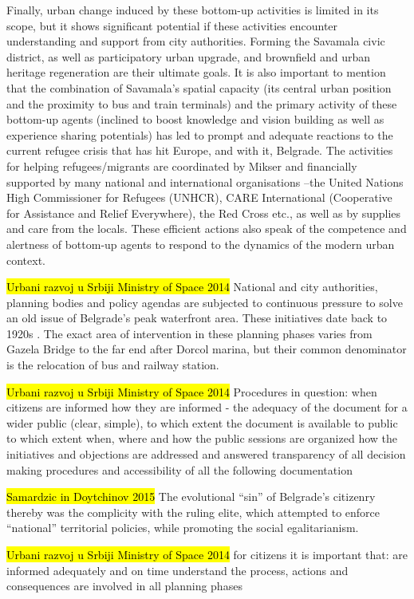 \documentclass[11pt]{report}
\begin{document}
Finally, urban change induced by these bottom-up activities is limited in its scope, but it shows significant potential if these activities encounter understanding and support from city authorities. Forming the Savamala civic district, as well as participatory urban upgrade, and brownfield and urban heritage regeneration are their ultimate goals. It is also important to mention that the combination of Savamala’s spatial capacity (its central urban position and the proximity to bus and train terminals) and the primary activity of these bottom-up agents (inclined to boost knowledge and vision building as well as experience sharing potentials) has led to prompt and adequate reactions to the current refugee crisis that has hit Europe, and with it, Belgrade. The activities for helping refugees/migrants are coordinated by Mikser and financially supported by many national and international organisations –the United Nations High Commissioner for Refugees (UNHCR), CARE International (Cooperative for Assistance and Relief Everywhere), the Red Cross etc., as well as by supplies and care from the locals.  These efficient actions also speak of the competence and alertness of bottom-up agents to respond to the dynamics of the modern urban context.

\hl{Urbani razvoj u Srbiji Ministry of Space 2014}
National and city authorities, planning bodies and policy agendas are subjected to continuous pressure to solve an old issue of Belgrade’s peak waterfront area. These initiatives date back to 1920s . The exact area of intervention in these planning phases varies from Gazela Bridge to the far end after Dorcol marina, but their common denominator is the relocation of bus and railway station.

\hl{Urbani razvoj u Srbiji Ministry of Space 2014}  
Procedures in question:
    when citizens are informed
    how they are informed - the adequacy of the document for a wider public (clear, simple), to which extent the document is available to public
    to which extent
    when, where and how the public sessions are organized
    how the initiatives and objections are addressed and answered
    transparency of all decision making procedures and accessibility of all the following documentation

\hl{Samardzic in Doytchinov 2015}
The evolutional “sin” of Belgrade’s citizenry thereby was the complicity with the ruling elite, which attempted to enforce “national” territorial policies, while promoting the social egalitarianism.

\hl{Urbani razvoj u Srbiji Ministry of Space 2014}
for citizens it is important that:
    are informed adequately and on time
    understand the process, actions and consequences
    are involved in all planning phases
    
\end{document}
